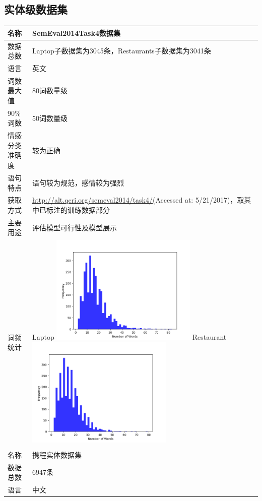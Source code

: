\subsection{实体级数据集}
\begin{center}  
\begin{longtabu} to 0.8\textwidth{X|X[3]} 

\hline
名称 & SemEval2014Task4数据集\\
\hline
数据总数 & Laptop子数据集为3045条，Restaurants子数据集为3041条\\
语言 & 英文\\
词数最大值 & 80词数量级\\
90\%词数 & 50词数量级\\
情感分类准确度 & 较为正确\\
语句特点 & 语句较为规范，感情较为强烈\\
获取方式 & \url{http://alt.qcri.org/semeval2014/task4/}(Accessed at: 5/21/2017)，取其中已标注的训练数据部分\\
主要用途 & 评估模型可行性及模型展示\\
词频统计 & 
Laptop\newline
\includegraphics[width=0.6\textwidth, height=0.3\textwidth]{graphic/wordsnum_semval14_laptop.png}
\newline
Restaurant
\newline
\includegraphics[width=0.6\textwidth, height=0.3\textwidth]{graphic/wordsnum_semval14_restaurants.png}\\
\\
\hline
名称 & 携程实体数据集\\
\hline
数据总数 & 6947条\\
语言 & 中文\\

\end{longtabu}
\end{center}
